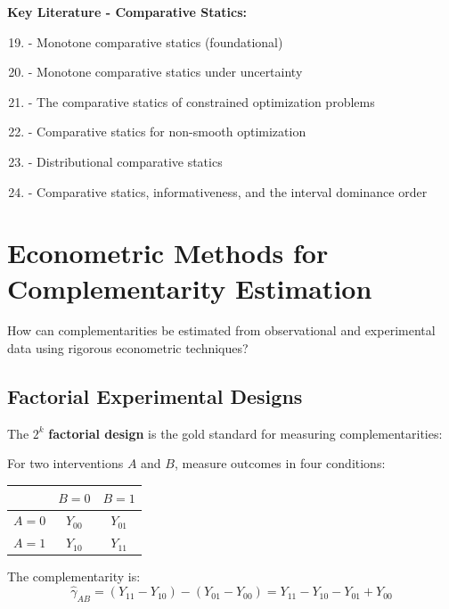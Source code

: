 \textbf{Key Literature - Comparative Statics:}
\begin{enumerate}[noitemsep]
    \setcounter{enumi}{18}
    \item \citet{milgrom1994} - Monotone comparative statics (foundational)
    \item \citet{athey2002} - Monotone comparative statics under uncertainty
    \item \citet{quah2007} - The comparative statics of constrained optimization problems
    \item \citet{quah2009} - Comparative statics for non-smooth optimization
    \item \citet{jensen2018} - Distributional comparative statics
    \item \citet{strulovici2010} - Comparative statics, informativeness, and the interval dominance order
\end{enumerate}

\section{Econometric Methods for Complementarity Estimation}
\label{sec:econometric-methods}

\begin{tcolorbox}[colback=green!5!white,colframe=green!75!black,title=\textbf{Fundamental Question}]
How can complementarities be estimated from observational and experimental data using rigorous econometric techniques?
\end{tcolorbox}

\subsection{Factorial Experimental Designs}
\label{subsec:factorial-designs}

The $2^k$ \textbf{factorial design} is the gold standard for measuring complementarities:

\begin{definition}
For two interventions $A$ and $B$, measure outcomes in four conditions:
\begin{center}
\begin{tabular}{c|cc}
& $B = 0$ & $B = 1$ \\
\hline
$A = 0$ & $Y_{00}$ & $Y_{01}$ \\
$A = 1$ & $Y_{10}$ & $Y_{11}$
\end{tabular}
\end{center}
The complementarity is:
\begin{equation}
\hat{\gamma}_{AB} = (Y_{11} - Y_{10}) - (Y_{01} - Y_{00}) = Y_{11} - Y_{10} - Y_{01} + Y_{00}
\label{eq:factorial-gamma}
\end{equation}
\end{definition}

